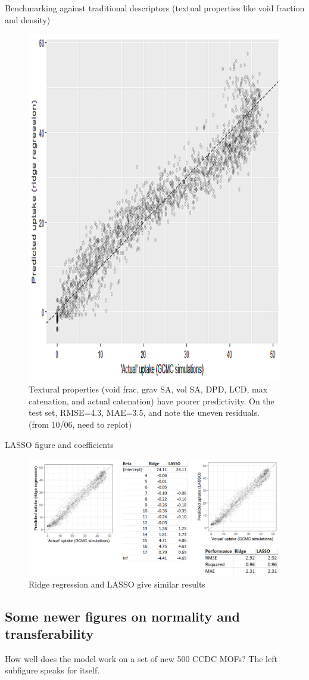 \documentclass[letterpaper]{article}
\begin{document}
\begin{outline}
	\1 Benchmarking against traditional descriptors (textual properties like void fraction and density)
	\begin{figure}[H]
		\centering
		\includegraphics[width=0.5\columnwidth]{Figs/textural_prediction.png}
		\caption{Textural properties (void frac, grav SA, vol SA, DPD, LCD, max catenation, and actual catenation) have poorer predictivity.  On the test set, RMSE=4.3, MAE=3.5, and note the uneven residuals. (from 10/06, need to replot)}
		\label{fig:textural}
	\end{figure}
	\1 LASSO figure and coefficients
	\begin{figure}[H]
		\centering
		\includegraphics[width=0.75\columnwidth]{Figs/ridge_vs_lasso.png}
		\caption{Ridge regression and LASSO give similar results}
		\label{fig:lasso}
	\end{figure}
	
\end{outline}


\subsection{Some newer figures on normality and transferability}
How well does the model work on a set of new 500 CCDC MOFs?  The left subfigure speaks for itself.
\end{document}
